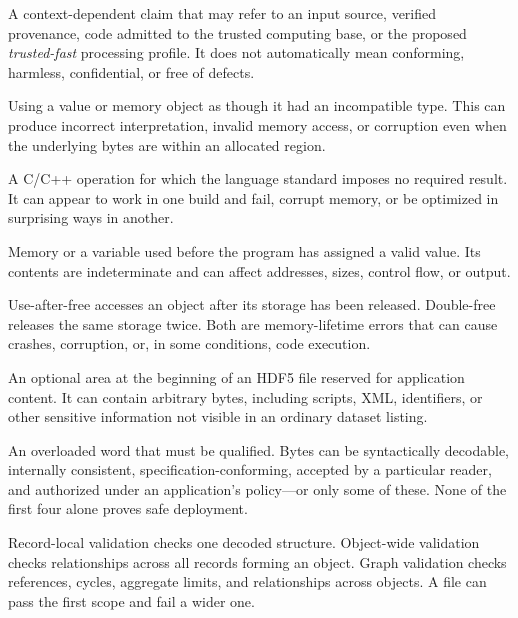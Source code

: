 \documentclass[../main.tex]{subfiles}
\begin{document}
\begin{description}[leftmargin=1.5em,style=nextline]
\item[Trusted.]
A context-dependent claim that may refer to an input source, verified
provenance, code admitted to the trusted computing base, or the proposed
\emph{trusted-fast} processing profile. It does not automatically mean
conforming, harmless, confidential, or free of defects.

\item[Type confusion.]
Using a value or memory object as though it had an incompatible type. This can
produce incorrect interpretation, invalid memory access, or corruption even
when the underlying bytes are within an allocated region.

\item[Undefined behavior.]
A C/C++ operation for which the language standard imposes no required result.
It can appear to work in one build and fail, corrupt memory, or be optimized in
surprising ways in another.

\item[Uninitialized value.]
Memory or a variable used before the program has assigned a valid value. Its
contents are indeterminate and can affect addresses, sizes, control flow, or
output.

\item[Use-after-free / double-free.]
Use-after-free accesses an object after its storage has been released.
Double-free releases the same storage twice. Both are memory-lifetime errors
that can cause crashes, corruption, or, in some conditions, code execution.

\item[User block.]
An optional area at the beginning of an HDF5 file reserved for application
content. It can contain arbitrary bytes, including scripts, XML, identifiers,
or other sensitive information not visible in an ordinary dataset listing.

\item[Valid.]
An overloaded word that must be qualified. Bytes can be syntactically
decodable, internally consistent, specification-conforming, accepted by a
particular reader, and authorized under an application's policy---or only some
of these. None of the first four alone proves safe deployment.

\item[Validation scope: record, object, and graph.]
Record-local validation checks one decoded structure. Object-wide validation
checks relationships across all records forming an object. Graph validation
checks references, cycles, aggregate limits, and relationships across objects.
A file can pass the first scope and fail a wider one.


\end{description}
\end{document}

